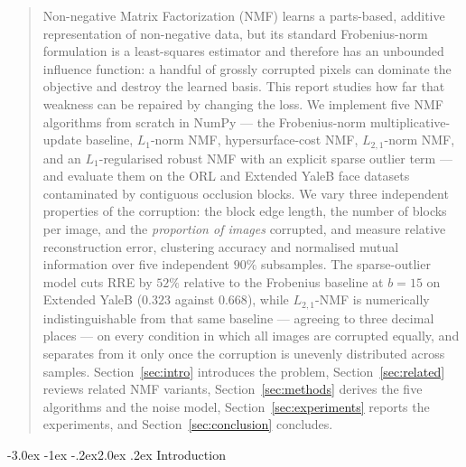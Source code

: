 \documentclass[12pt,a4paper]{article}
\makeatletter
\renewcommand\section{\@startsection{section}{1}{\z@}%
    {-3.0ex \@plus -1ex \@minus -.2ex}{2.0ex \@plus.2ex}%
    {\normalfont\fontsize{13}{15}\bfseries}}
\makeatother
\begin{document}
\begin{abstract}
\noindent
Non-negative Matrix Factorization (NMF) learns a parts-based, additive
representation of non-negative data, but its standard Frobenius-norm
formulation is a least-squares estimator and therefore has an unbounded
influence function: a handful of grossly corrupted pixels can dominate the
objective and destroy the learned basis. This report studies how far that
weakness can be repaired by changing the loss. We implement five NMF
algorithms from scratch in NumPy --- the Frobenius-norm multiplicative-update
baseline, $L_1$-norm NMF, hypersurface-cost NMF, $L_{2,1}$-norm NMF, and an
$L_1$-regularised robust NMF with an explicit sparse outlier term --- and
evaluate them on the ORL and Extended YaleB face datasets contaminated by
contiguous occlusion blocks. We vary three independent properties of the
corruption: the block edge length, the number of blocks per image, and the
\emph{proportion of images} corrupted, and measure relative reconstruction
error, clustering accuracy and normalised mutual information over five
independent $90\%$ subsamples. The sparse-outlier model cuts
RRE by $52\%$ relative to the Frobenius baseline at $b=15$ on Extended YaleB
($0.323$ against $0.668$), while $L_{2,1}$-NMF is numerically indistinguishable
from that same baseline --- agreeing to three decimal places --- on every
condition in which all images are corrupted equally, and separates from it only
once the corruption is unevenly distributed across samples. Section~\ref{sec:intro} introduces the problem,
Section~\ref{sec:related} reviews related NMF variants,
Section~\ref{sec:methods} derives the five algorithms and the noise model,
Section~\ref{sec:experiments} reports the experiments, and
Section~\ref{sec:conclusion} concludes.
\end{abstract}

\section{Introduction}
\label{sec:intro}
\end{document}
